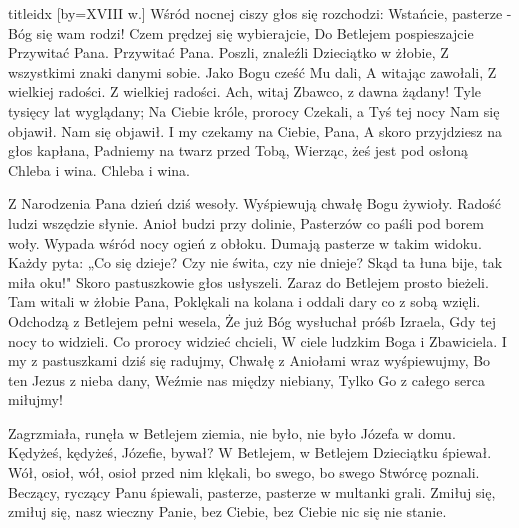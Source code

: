 \documentclass[a5paper, portrait, 12pt]{mwart}
\begin{document}
\begin{songs}{titleidx}
\endsong
[by={XVIII w.}]
\beginverse
    Wśród nocnej ciszy głos się rozchodzi:
    Wstańcie, pasterze - Bóg się wam rodzi!
    Czem prędzej się wybierajcie,
    Do Betlejem pospieszajcie
    Przywitać Pana.
    Przywitać Pana.
\endverse
\beginverse
    Poszli, znaleźli Dzieciątko w żłobie,
    Z wszystkimi znaki danymi sobie.
    Jako Bogu cześć Mu dali,
    A witając zawołali,
    Z wielkiej radości.
    Z wielkiej radości.
\endverse
\beginverse
    Ach, witaj Zbawco, z dawna żądany!
    Tyle tysięcy lat wyglądany;
    Na Ciebie króle, prorocy
    Czekali, a Tyś tej nocy
    Nam się objawił.
    Nam się objawił.
\endverse
\beginverse
    I my czekamy na Ciebie, Pana,
    A skoro przyjdziesz na głos kapłana,
    Padniemy na twarz przed Tobą,
    Wierząc, żeś jest pod osłoną
    Chleba i wina.
    Chleba i wina.
\endverse
\endsong

\beginverse
Z Narodzenia Pana dzień dziś wesoły.
Wyśpiewują chwałę Bogu żywioły.
Radość ludzi wszędzie słynie.
Anioł budzi przy dolinie,
Pasterzów co paśli pod borem woły.
\endverse
\beginverse
Wypada wśród nocy ogień z obłoku.
Dumają pasterze w takim widoku.
Każdy pyta: „Co się dzieje?
Czy nie świta, czy nie dnieje?
Skąd ta łuna bije, tak miła oku!"
\endverse
\beginverse
Skoro pastuszkowie głos usłyszeli.
Zaraz do Betlejem prosto bieżeli.
Tam witali w żłobie Pana,
Poklękali na kolana i oddali dary co z sobą wzięli.
\endverse
\beginverse
Odchodzą z Betlejem pełni wesela,
Że już Bóg wysłuchał próśb Izraela,
Gdy tej nocy to widzieli.
Co prorocy widzieć chcieli,
W ciele ludzkim Boga i Zbawiciela.
\endverse
\beginverse
I my z pastuszkami dziś się radujmy,
Chwałę z Aniołami wraz wyśpiewujmy,
Bo ten Jezus z nieba dany,
Weźmie nas między niebiany,
Tylko Go z całego serca miłujmy!
\endverse
\endsong



\beginverse
Zagrzmiała, runęła w Betlejem ziemia,
nie było, nie było Józefa w domu.
\endverse
\beginverse
Kędyżeś, kędyżeś, Józefie, bywał?
W Betlejem, w Betlejem Dzieciątku śpiewał.
\endverse
\beginverse
Wół, osioł, wół, osioł przed nim klękali,
bo swego, bo swego Stwórcę poznali.
\endverse
\beginverse
Beczący, ryczący Panu śpiewali,
pasterze, pasterze w multanki grali.
\endverse
\beginverse
Zmiłuj się, zmiłuj się, nasz wieczny Panie,
bez Ciebie, bez Ciebie nic się nie stanie.
\endverse
\endsong


\end{songs}
\end{document}
